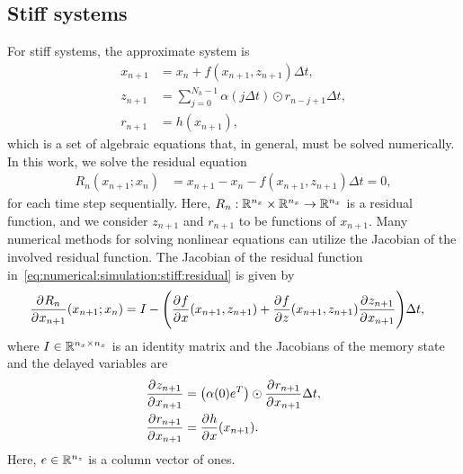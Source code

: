 \subsection{Stiff systems}\label{sec:numerical:simulation:stiff}
For stiff systems, the approximate system is
%
\begin{subequations}\label{eq:numerical:simulation:stiff}
	\begin{align}
		\label{eq:numerical:simulation:stiff:x}
		x_{n+1} &= x_n + f(x_{n+1}, z_{n+1}) \Delta t, \\
		\label{eq:numerical:simulation:stiff:z}
		z_{n+1} &= \sum_{j=0}^{N_h-1} \alpha(j \Delta t) \odot r_{n-j+1} \Delta t, \\
		\label{eq:numerical:simulation:stiff:r}
		r_{n+1} &= h(x_{n+1}),
	\end{align}
\end{subequations}
%
which is a set of algebraic equations that, in general, must be solved numerically. In this work, we solve the residual equation
%
\begin{align}\label{eq:numerical:simulation:stiff:residual}
	R_n(x_{n+1}; x_n) &= x_{n+1} - x_n - f(x_{n+1}, z_{n+1}) \Delta t = 0,
\end{align}
%
for each time step sequentially. Here, $R_n: \mathbb{R}^{n_x} \times \mathbb{R}^{n_x} \rightarrow \mathbb{R}^{n_x}$ is a residual function, and we consider $z_{n+1}$ and $r_{n+1}$ to be functions of $x_{n+1}$.
%
Many numerical methods for solving nonlinear equations can utilize the Jacobian of the involved residual function. The Jacobian of the residual function in~\eqref{eq:numerical:simulation:stiff:residual} is given by
%
\begin{align}
	\frac{\partial^{}{R_n}}{\partial^{}{x_{n+1}}}(x_{n+1}; x_n) &= I - \Bigg(\frac{\partial^{}{f}}{\partial^{}{x}}(x_{n+1}, z_{n+1}) + \frac{\partial^{}{f}}{\partial^{}{z}}(x_{n+1}, z_{n+1}) \frac{\partial^{}{z_{n+1}}}{\partial^{}{x_{n+1}}}\Bigg) \Delta t,
\end{align}
%
where $I \in \mathbb{R}^{n_x \times n_x}$ is an identity matrix and the Jacobians of the memory state and the delayed variables are
%
\begin{subequations}
	\begin{align}
		\frac{\partial^{}{z_{n+1}}}{\partial^{}{x_{n+1}}} &= \left(\alpha(0) e^T\right) \odot \frac{\partial^{}{r_{n+1}}}{\partial^{}{x_{n+1}}} \Delta t, \\
		\frac{\partial^{}{r_{n+1}}}{\partial^{}{x_{n+1}}} &= \frac{\partial^{}{h}}{\partial^{}{x}}(x_{n+1}).
	\end{align}
\end{subequations}
%
Here, $e \in \mathbb{R}^{n_z}$ is a column vector of ones.
